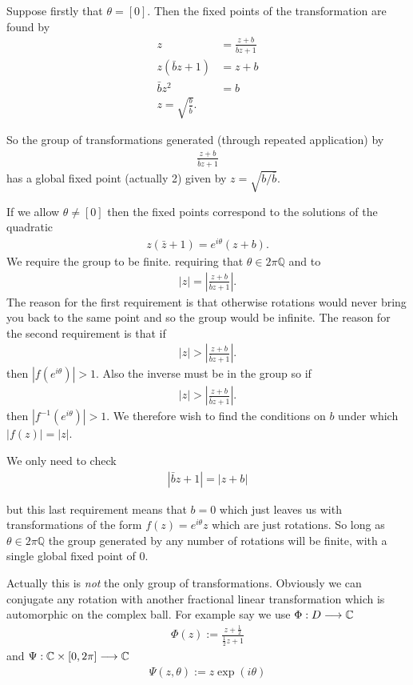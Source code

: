 \documentclass{unswmaths}
\begin{document}
Suppose firstly that $ \theta = [0] $. Then the fixed points of the transformation are found by
\begin{align}
	z 	&= \frac{z + b}{\bar{b}z + 1} \\
	z(\bar{b}z + 1) &= z + b \\
	\bar{b}z^2 &= b \\
	z = \sqrt{\frac{b}{\bar{b}}}.
\end{align}

So the group of transformations generated (through repeated application) by
\begin{align}
	\frac{z+b}{\bar{b}{z} + 1}
\end{align}
has a global fixed point (actually 2) given by $ z = \sqrt{ b / \bar{b}} $.

If we allow $ \theta \neq [0] $ then the fixed points correspond to the solutions of the quadratic
\begin{align}
	z(\bar{z} + 1) = e^{i\theta}(z+ b).
\end{align}
We require the group to be finite. 
requiring that $ \theta \in 2\pi \mathbb{Q} $ and to
\begin{align}
	|z| = \left| \frac{z+b}{\bar{b}z + 1} \right|.
\end{align}
The reason for the first requirement is that otherwise rotations would never bring you back to the same point and so the group would be infinite. The reason for the second requirement is that if
\begin{align}
	|z| > \left| \frac{z+b}{\bar{b}z + 1} \right|.
\end{align}
then $ |f(e^{i\theta})| > 1 $. Also the inverse must be in the group so if 
\begin{align}
	|z| > \left| \frac{z+b}{\bar{b}z + 1} \right|.
\end{align}
then $ |f^{-1}(e^{i\theta})| > 1 $.
We therefore wish to find the conditions on $ b $ under which $ |f(z)| = |z| $. 

We only need to check
\begin{align}
	|\bar{b}z + 1| = |z + b|
\end{align}

but this last requirement means that $ b = 0 $ which just leaves us with transformations of the form
$ f(z) = e^{i \theta} z $ which are just rotations. So long as $ \theta \in 2\pi\mathbb{Q} $ the group generated by any number of rotations will be finite, with a single global fixed point of 0.

Actually this is \emph{not} the only group of transformations. Obviously we can conjugate any rotation with another fractional linear transformation which is automorphic on the complex ball. For example say we use
$ \Phi: D \longrightarrow \mathbb{C} $
\begin{align}
	\Phi(z) := \frac{z + \frac{1}{2}}{\frac{1}{2}z+1}
\end{align}
and $ \Psi : \mathbb{C} \times [0, 2\pi] \longrightarrow \mathbb{C} $
\begin{align}
	\Psi(z,\theta) := z \exp(i\theta)
\end{align}
\end{document}

